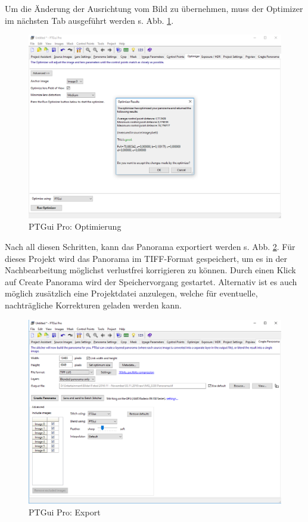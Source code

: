\documentclass[liststotoc,bibtotoc,fontsize=14pt,]{scrreprt}
\begin{document}
	\bigskip
	Um die Änderung der Ausrichtung vom Bild zu übernehmen, muss der \grqq{}Optimizer\grqq{} im nächsten Tab ausgeführt werden s. Abb. \ref{img:ptgui_step_6}.
	\begin{figure}[H]
		\includegraphics[width=\linewidth]{img/steps/PTGui_Step_6.PNG}
		\caption{PTGui Pro: Optimierung}
		\label{img:ptgui_step_6}
	\end{figure}
	\bigskip
	Nach all diesen Schritten, kann das Panorama exportiert werden s. Abb. \ref{img:ptgui_step_7}. Für dieses Projekt wird das Panorama im TIFF-Format gespeichert, um es in der Nachbearbeitung möglichst verlustfrei korrigieren zu können. Durch einen Klick auf \grqq{}Create Panorama\grqq{} wird der Speichervorgang gestartet. Alternativ ist es auch möglich zusätzlich eine Projektdatei anzulegen, welche für eventuelle, nachträgliche Korrekturen geladen werden kann. 
	\begin{figure}[H]
		\includegraphics[width=\linewidth]{img/steps/PTGui_Step_7.PNG}
		\caption{PTGui Pro: Export}
		\label{img:ptgui_step_7}
	\end{figure}
	
\end{document}

